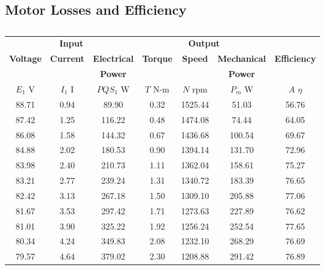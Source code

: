 \documentclass{article}
\begin{document}
\subsection{Motor Losses and Efficiency}
\begin{table}[H]
  \centering
  \begin{tabular}{*{7}{c}}
    \multicolumn{3}{c}{\textbf{Input}} & \multicolumn{3}{c}{\textbf{Output}}
    & \\

    \textbf{Voltage} & \textbf{Current} & \textbf{Electrical} &
    \textbf{Torque}  & \textbf{Speed}   & \textbf{Mechanical} &
    \textbf{Efficiency} \\

    &                  & \textbf{Power}      &
    &                  & \textbf{Power}
    & \\

    $E_1$ V          & $I_1$ I          & $PQS_1$ W           &
    $T$ N-m          & $N$ rpm          & $P_{m}$ W           &
    $A$ $\eta$ \\

    \hline

    88.71 & 0.94 &  89.90 & 0.32 & 1525.44 &  51.03 & 56.76 \\
    87.42 & 1.25 & 116.22 & 0.48 & 1474.08 &  74.44 & 64.05 \\
    86.08 & 1.58 & 144.32 & 0.67 & 1436.68 & 100.54 & 69.67 \\
    84.88 & 2.02 & 180.53 & 0.90 & 1394.14 & 131.70 & 72.96 \\
    83.98 & 2.40 & 210.73 & 1.11 & 1362.04 & 158.61 & 75.27 \\
    83.21 & 2.77 & 239.24 & 1.31 & 1340.72 & 183.39 & 76.65 \\
    82.42 & 3.13 & 267.18 & 1.50 & 1309.10 & 205.88 & 77.06 \\
    81.67 & 3.53 & 297.42 & 1.71 & 1273.63 & 227.89 & 76.62 \\
    81.01 & 3.90 & 325.22 & 1.92 & 1256.24 & 252.54 & 77.65 \\
    80.34 & 4.24 & 349.83 & 2.08 & 1232.10 & 268.29 & 76.69 \\
    79.57 & 4.64 & 379.02 & 2.30 & 1208.88 & 291.42 & 76.89 \\
  \end{tabular}
  \caption{}
  \label{}
\end{table}
\end{document}
